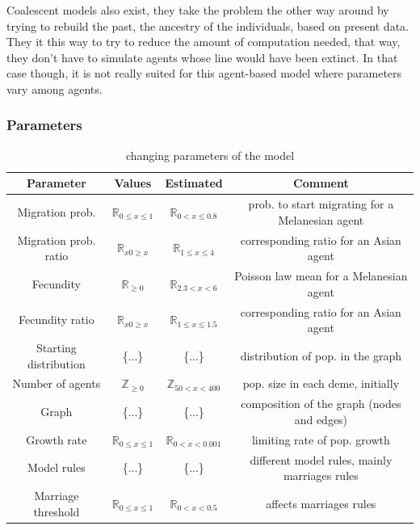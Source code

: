 \documentclass[a4paper,12pt]{report}
\begin{document}
Coalescent models also exist, they take the problem the other way around by trying to rebuild the past, the ancestry of the individuals, based on present data. They it this way to try to reduce the amount of computation needed, that way, they don't have to simulate agents whose line would have been extinct. In that case though, it is not really suited for this agent-based model where parameters vary among agents.
\subsubsection{Parameters}

\begin{table}
	\hspace*{-1cm}
	\begin{tabular}{|c|c|c|c|}
		\hline
 		Parameter & Values & Estimated & Comment \\ \hline
        Migration prob. & $\mathbb{R}_{0 \leq x \leq 1}$ & $\mathbb{R}_{0 < x \leq 0.8}$ & prob. to start migrating for a Melanesian agent \\ \hline
        Migration prob. ratio & $\mathbb{R}_{x 0 \geq x}$ & $\mathbb{R}_{1 \leq x \leq 4}$ & corresponding ratio for an Asian agent \\ \hline
        Fecundity & $\mathbb{R}_{\geq 0}$ & $\mathbb{R}_{2.3 < x < 6}$ & Poisson law mean for a Melanesian agent \\ \hline
        Fecundity ratio & $\mathbb{R}_{x 0 \geq x}$ & $\mathbb{R}_{1 \leq x \leq 1.5}$ & corresponding ratio for an Asian agent \\ \hline
        Starting distribution & \{...\} & \{...\} & distribution of pop. in the graph \\ \hline
        Number of agents & $\mathbb{Z}_{\geq 0}$ & $\mathbb{Z}_{50 < x < 400}$ & pop. size in each deme, initially \\ \hline
        Graph & \{...\} & \{...\} & composition of the graph (nodes and edges) \\ \hline
        Growth rate & $\mathbb{R}_{0 \leq x \leq 1}$ & $\mathbb{R}_{0 < x < 0.001}$ & limiting rate of pop. growth \\ \hline
        Model rules & \{...\} & \{...\} & different model rules, mainly marriages rules \\ \hline
        Marriage threshold & $\mathbb{R}_{0 \leq x \leq 1}$ & $\mathbb{R}_{0 < x < 0.5}$ & affects marriages rules \\ \hline
	\end{tabular}
	\caption{changing parameters of the model}
	\label{parameters}
\end{table}
\end{document}
